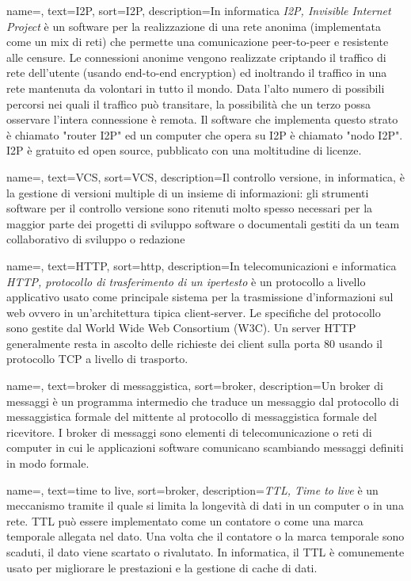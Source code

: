 {
    name=,
    text=I2P,
    sort=I2P,
    description={In informatica \emph{I2P, Invisible Internet Project} è un software per la realizzazione di una rete anonima (implementata come un mix di reti) che permette una comunicazione peer-to-peer e resistente alle censure. Le connessioni anonime vengono realizzate criptando il traffico di rete dell'utente (usando end-to-end encryption) ed inoltrando il traffico in una rete mantenuta da volontari in tutto il mondo. Data l'alto numero di possibili percorsi nei quali il traffico può transitare, la possibilità che un terzo possa osservare l'intera connessione è remota. Il software che implementa questo strato è chiamato "router I2P" ed un computer che opera su I2P è chiamato "nodo I2P". I2P è gratuito ed open source, pubblicato con una moltitudine di licenze.}
}

{
    name=,
    text=VCS,
    sort=VCS,
    description={Il controllo versione, in informatica, è la gestione di versioni multiple di un insieme di informazioni: gli strumenti software per il controllo versione sono ritenuti molto spesso necessari per la maggior parte dei progetti di sviluppo software o documentali gestiti da un team collaborativo di sviluppo o redazione}
}


{
    name=,
    text=HTTP,
    sort=http,
    description={In telecomunicazioni e informatica \emph{HTTP, protocollo di trasferimento di un ipertesto} è un protocollo a livello applicativo usato come principale sistema per la trasmissione d'informazioni sul web ovvero in un'architettura tipica client-server. Le specifiche del protocollo sono gestite dal World Wide Web Consortium (W3C). Un server HTTP generalmente resta in ascolto delle richieste dei client sulla porta 80 usando il protocollo TCP a livello di trasporto. }
}

{
    name=,
    text=broker di messaggistica,
    sort=broker,
    description={Un broker di messaggi è un programma intermedio
che traduce un messaggio dal protocollo di messaggistica formale del mittente al
protocollo di messaggistica formale del ricevitore. I broker di messaggi sono elementi
di telecomunicazione o reti di computer in cui le applicazioni software comunicano
scambiando messaggi definiti in modo formale.}
}

{
    name=,
    text=time to live,
    sort=broker,
    description={\emph{TTL, Time to live} è un meccanismo tramite il quale si limita la longevità di dati in un computer o in una rete. TTL può essere implementato come un contatore o come una marca temporale allegata nel dato. Una volta che il contatore o la marca temporale sono scaduti, il dato viene scartato o rivalutato. In informatica, il TTL è comunemente usato per migliorare le prestazioni e la gestione di cache di dati.}
}



